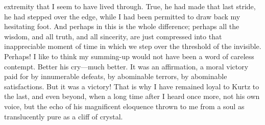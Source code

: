\documentclass[12pt]{report}
\begin{document}
extremity that I seem to have lived through. True, he had made that last
stride, he had stepped over the edge, while I had been permitted to draw
back my hesitating foot. And perhaps in this is the whole difference;
perhaps all the wisdom, and all truth, and all sincerity, are just
compressed into that inappreciable moment of time in which we step over
the threshold of the invisible. Perhaps! I like to think my summing-up
would not have been a word of careless contempt. Better his cry---much
better. It was an affirmation, a moral victory paid for by innumerable
defeats, by abominable terrors, by abominable satisfactions. But it was
a victory! That is why I have remained loyal to Kurtz to the last, and
even beyond, when a long time after I heard once more, not his own
voice, but the echo of his magnificent eloquence thrown to me from a
soul as translucently pure as a cliff of crystal.
\end{document}
